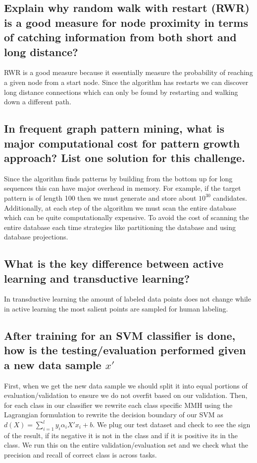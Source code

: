 \documentclass[11pt]{article}
\begin{document}
\subsection{Explain why random walk with restart (RWR) is a good measure for node proximity in terms of catching information from both short and long distance?}
RWR is a good measure because it essentially measure the probability of reaching a given node from a start node. Since the algorithm has restarts we can discover long distance connections which can only be found by restarting and walking down a different path. 
\subsection{In frequent graph pattern mining, what is major computational cost for pattern growth approach? List one solution for this challenge.}
Since the algorithm finds patterns by building from the bottom up for long sequences this can have major overhead in memory. For example, if the target pattern is of length 100 then we must generate and store about $10^30$ candidates. Additionally, at each step of the algorithm we must scan the entire database which can be quite computationally expensive. To avoid the cost of scanning the entire database each time strategies like partitioning the database and using database projections. 
\subsection{What is the key difference between active learning and transductive learning?}
In transductive learning the amount of labeled data points does not change while in active learning the most salient points are sampled for human labeling. 
\subsection{After training for an SVM classifier is done, how is the testing/evaluation performed given a new data sample $x'$}
First, when we get the new data sample we should split it into equal portions of evaluation/validation to ensure we do not overfit based on our validation. Then, for each class in our classifier we rewrite each class specific MMH using the Lagrangian formulation to rewrite the decision boundary of our SVM as $d(X) = \sum_{i=1}^l y_i \alpha_i X'x_i+b$. We plug our test dataset and check to see the sign of the result, if its negative it is not in the class and if it is positive its in the class. We run this on the entire validation/evaluation set and we check what the precision and recall of correct class is across tasks.
\end{document}
